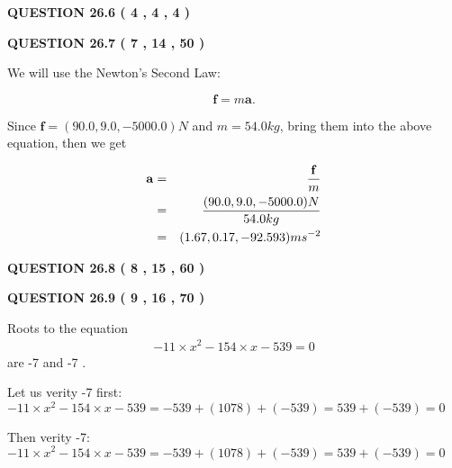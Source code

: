\documentclass[12pt]{article}
\begin{document}
{\textbf{\Large{QUESTION
26.6 
 (           4 ,           4 ,           4 )
}}}
  
  
  
\vspace{0.2in}
  
{\textbf{\Large{QUESTION
26.7 
 (           7 ,          14 ,          50 )
}}}
  
  
 
 

We will use the Newton's Second Law:
 
\[
\mathbf{f}=m\mathbf{a}.
\]
 
Since $\mathbf{f}= %
(90.0 , 9.0 , -5000.0) N$
and $m= %
54.0kg$, bring them into the above equation, then we get
 
\begin{eqnarray*}
\mathbf{a}&=&\frac{\mathbf{f}}m  \\
&=&\frac{ %
(90.0 , 9.0 , -5000.0) N}{ %
54.0kg}  \\
&=& %
(1.67 , 0.17 , -92.593) ms^{-2}
\end{eqnarray*}
 
 
 
  
\vspace{0.2in}
  
{\textbf{\Large{QUESTION
26.8 
 (           8 ,          15 ,          60 )
}}}
  
  
 
 

 
 
  
\vspace{0.2in}
  
{\textbf{\Large{QUESTION
26.9 
 (           9 ,          16 ,          70 )
}}}
  
  


 
 

Roots to the equation
\begin{eqnarray*}
-11 \times x^2  %
-154
                 \times x    %
-539 =0
\end{eqnarray*}
are  %
-7 and  %
-7 .
 
Let us verity  %
-7 first:
$  %
-11 \times x^2  %
-154
                 \times x    %
-539
  = %
-539+( %
1078)+( %
-539)
  = %
539+( %
-539)
  = %
0
$
 
Then verity  %
-7:
$  %
-11 \times x^2  %
-154
                 \times x    %
-539
  = %
-539+( %
1078)+( %
-539)
  = %
539+( %
-539)
  = %
0
$
 
 
 
\end{document}
